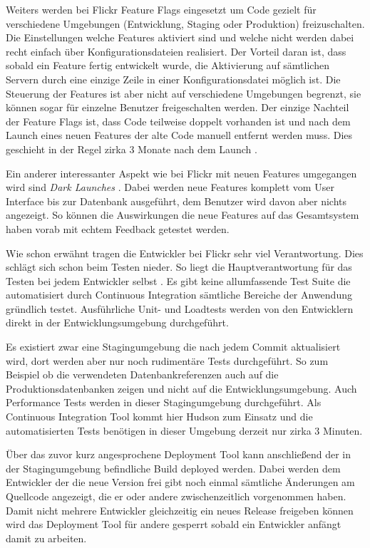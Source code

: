 Weiters werden bei Flickr Feature Flags eingesetzt um Code gezielt für
verschiedene Umgebungen (Entwicklung, Staging oder Produktion) freizuschalten.
Die Einstellungen welche Features aktiviert sind und welche nicht werden dabei
recht einfach über Konfigurationsdateien realisiert. Der Vorteil daran ist,
dass sobald ein Feature fertig entwickelt wurde, die Aktivierung auf
sämtlichen Servern durch eine einzige Zeile in einer Konfigurationsdatei
möglich ist. Die Steuerung der Features ist aber nicht auf verschiedene
Umgebungen begrenzt, sie können sogar für einzelne Benutzer freigeschalten
werden. Der einzige Nachteil der Feature Flags ist, dass Code teilweise 
doppelt vorhanden ist und nach dem Launch eines neuen Features der alte Code
manuell entfernt werden muss. Dies geschieht in der Regel zirka 3 Monate nach
dem Launch \cite{flickr11}.

Ein anderer interessanter Aspekt wie bei Flickr mit neuen Features umgegangen
wird sind \emph{Dark Launches} \cite{flickr11}. Dabei werden neue Features
komplett vom User Interface bis zur Datenbank ausgeführt, dem Benutzer wird
davon aber nichts angezeigt. So können die Auswirkungen die neue Features auf
das Gesamtsystem haben vorab mit echtem Feedback getestet werden.

Wie schon erwähnt tragen die Entwickler bei Flickr sehr viel Verantwortung.
Dies schlägt sich schon beim Testen nieder. So liegt die Hauptverantwortung
für das Testen bei jedem Entwickler selbst \cite{flickr11}. Es gibt keine
allumfassende Test Suite die automatisiert durch Continuous Integration
sämtliche Bereiche der Anwendung gründlich testet. Ausführliche Unit- und
Loadtests werden von den Entwicklern direkt in der Entwicklungsumgebung
durchgeführt.

Es existiert zwar eine Stagingumgebung die nach jedem Commit aktualisiert
wird, dort werden aber nur noch rudimentäre Tests durchgeführt. So zum
Beispiel ob die verwendeten Datenbankreferenzen auch auf die
Produktionsdatenbanken zeigen und nicht auf die Entwicklungsumgebung. Auch
Performance Tests werden in dieser Stagingumgebung durchgeführt. Als
Continuous Integration Tool kommt hier Hudson zum Einsatz und die
automatisierten Tests benötigen in dieser Umgebung derzeit nur zirka 3
Minuten.

Über das zuvor kurz angesprochene Deployment Tool kann anschließend der in der
Stagingumgebung befindliche Build deployed werden. Dabei werden dem Entwickler
der die neue Version frei gibt noch einmal sämtliche Änderungen am Quellcode
angezeigt, die er oder andere zwischenzeitlich vorgenommen haben. Damit nicht
mehrere Entwickler gleichzeitig ein neues Release freigeben können wird das
Deployment Tool für andere gesperrt sobald ein Entwickler anfängt damit zu
arbeiten.

